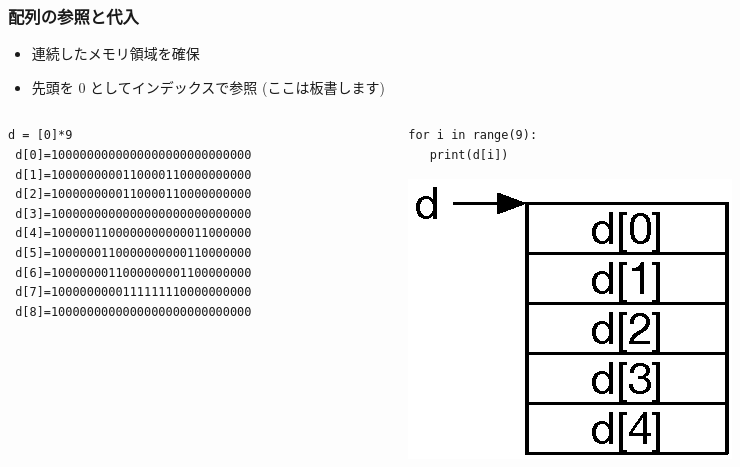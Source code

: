 \begin{frame}[containsverbatim]
\frametitle{配列の参照と代入}
  \begin{itemize}
\item 連続したメモリ領域を確保
\item 先頭を 0 としてインデックスで参照 (ここは板書します)
  \end{itemize}
\tiny
  \begin{columns}
    \begin{column}{0.5\textwidth}
      \begin{lstlisting}[caption={代入},label=array-assign]
 d = [0]*9
 d[0]=1000000000000000000000000000
 d[1]=1000000000110000110000000000
 d[2]=1000000000110000110000000000
 d[3]=1000000000000000000000000000
 d[4]=1000001100000000000011000000
 d[5]=1000000110000000000110000000
 d[6]=1000000011000000001100000000
 d[7]=1000000000111111110000000000
 d[8]=1000000000000000000000000000
      \end{lstlisting}
    \end{column}
    \begin{column}{0.35\textwidth}
      \begin{lstlisting}[caption={参照},label=array-ref]
 for i in range(9):
   print(d[i])
      \end{lstlisting}
\centering
\includegraphics[scale=0.5]{./Figure/elementaryCS-figArray.eps}
    \end{column}
  \end{columns}
\end{frame}
